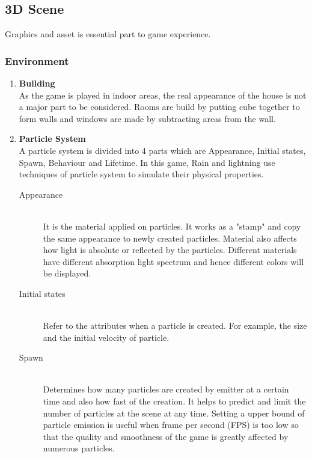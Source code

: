 \documentclass{article}
\begin{document}
\newpage

\subsection{3D Scene}
Graphics and asset is essential part to game experience.

\subsubsection{Environment}

\begin{enumerate}
    \item \textbf{Building} \\
    As the game is played in indoor areas, the real appearance of the house is not a major part to be considered. Rooms are build by putting cube together to form walls and windows are made by subtracting areas from the wall.
    
    \item \textbf{Particle System} \hfill \\
    A particle system is divided into 4 parts which are Appearance, Initial states, Spawn, Behaviour and Lifetime. \citep{ue4particle} In this game, Rain and lightning use techniques of particle system to simulate their physical properties.
    
    \begin{description} 
        \item[Appearance] \hfill \\
        It is the material applied on particles. It works as a "stamp" and copy the same appearance to newly created particles. Material also affects how light is absolute or reflected by the particles. Different materials have different absorption light spectrum and hence different colors will be displayed.
        
        \item[Initial states] \hfill \\
        Refer to the attributes when a particle is created. For example, the size and the initial velocity of particle.
        
        \item[Spawn] \hfill \\
        Determines how many particles are created by emitter at a certain time and also how fast of the creation. It helps to predict and limit the number of particles at the scene at any time. Setting a upper bound of particle emission is useful when frame per second (FPS) is too low so that the quality and smoothness of the game is greatly affected by numerous particles.
        

\end{description}
\end{enumerate}
\end{document}
